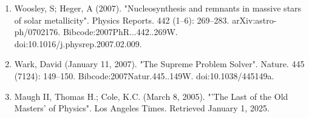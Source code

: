 \begin{enumerate}
\item Woosley, S; Heger, A (2007). "Nucleosynthesis and remnants in massive stars of solar metallicity". Physics Reports. 442 (1–6): 269–283. arXiv:astro-ph/0702176. Bibcode:2007PhR...442..269W. doi:10.1016/j.physrep.2007.02.009.
\item Wark, David (January 11, 2007). "The Supreme Problem Solver". Nature. 445 (7124): 149–150. Bibcode:2007Natur.445..149W. doi:10.1038/445149a.
\item Maugh II, Thomas H.; Cole, K.C. (March 8, 2005). "'The Last of the Old Masters' of Physics". Los Angeles Times. Retrieved January 1, 2025.
\end{enumerate}